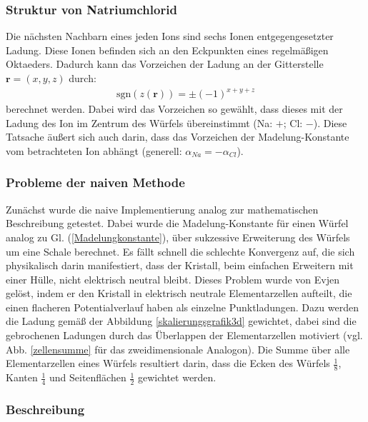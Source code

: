 \documentclass[10pt,a4paper]{article}
\begin{document}
\subsubsection{Struktur von Natriumchlorid}

Die nächsten Nachbarn eines jeden Ions sind sechs Ionen entgegengesetzter
Ladung. Diese Ionen befinden sich an den Eckpunkten eines regelmäßigen
Oktaeders. Dadurch kann das Vorzeichen der Ladung an der Gitterstelle
$\mathbf{r} = \left( x,y,z \right)$ durch:
\begin{align}
\mathrm{sgn}\left(z(\mathbf{r})\right) = \pm \left( -1 \right)^{x+y+z}
\end{align}
berechnet werden. Dabei wird das Vorzeichen so gewählt, dass dieses mit der Ladung
des Ion im Zentrum des Würfels übereinstimmt (Na: $+$; Cl: $-$). Diese Tatsache
äußert sich auch darin, dass das Vorzeichen der Madelung-Konstante vom
betrachteten Ion abhängt (generell: $\alpha_{Na} = - \alpha_{Cl}$).
\subsubsection{Probleme der naiven Methode}

Zunächst wurde die naive Implementierung analog zur mathematischen Beschreibung
getestet. Dabei wurde die Madelung-Konstante für einen Würfel analog zu
Gl. (\ref{Madelungkonstante}), über sukzessive Erweiterung des Würfels um eine
Schale berechnet. Es fällt schnell die schlechte Konvergenz auf, die sich
physikalisch darin manifestiert, dass der Kristall, beim einfachen Erweitern
mit einer Hülle, nicht elektrisch neutral bleibt. Dieses Problem wurde von Evjen
\cite{Evjen} gelöst, indem er den Kristall in elektrisch neutrale Elementarzellen
aufteilt, die einen flacheren Potentialverlauf haben als einzelne Punktladungen.
Dazu werden die Ladung gemäß der Abbildung \ref{skalierungsgrafik3d} gewichtet,
dabei sind die gebrochenen Ladungen durch das Überlappen der Elementarzellen motiviert
(vgl. Abb. \ref{zellensumme} für das zweidimensionale Analogon). Die Summe über 
alle Elementarzellen eines Würfels resultiert darin, dass die Ecken des Würfels
$\frac{1}{8}$, Kanten $\frac{1}{4}$ und Seitenflächen $\frac{1}{2}$ gewichtet werden.

\subsubsection{Beschreibung}
\end{document}
